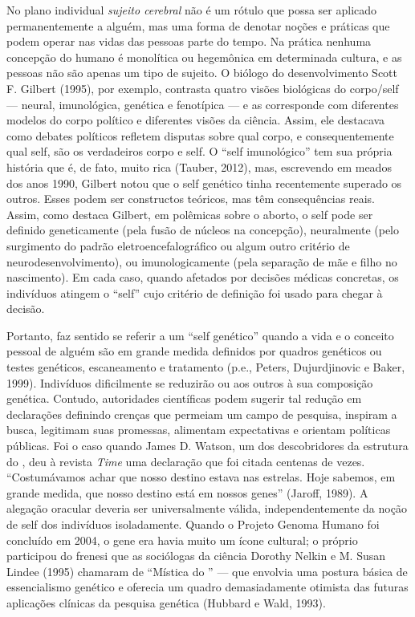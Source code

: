 No plano individual \emph{sujeito cerebral} não é um rótulo que possa
ser aplicado permanentemente a alguém, mas uma forma de denotar noções e
práticas que podem operar nas vidas das pessoas parte do tempo. Na
prática nenhuma concepção do humano é monolítica ou hegemônica em
determinada cultura, e as pessoas não são apenas um tipo de sujeito. O
biólogo do desenvolvimento Scott F. Gilbert (1995), por exemplo,
contrasta quatro visões biológicas do corpo/self --- neural,
imunológica, genética e fenotípica --- e as corresponde com diferentes
modelos do corpo político e diferentes visões da ciência. Assim, ele
destacava como debates políticos refletem disputas sobre qual corpo, e
consequentemente qual self, são os verdadeiros corpo e self. O ``self
imunológico'' tem sua própria história que é, de fato, muito rica
(Tauber, 2012), mas, escrevendo em meados dos anos 1990, Gilbert notou
que o self genético tinha recentemente superado os outros. Esses podem
ser constructos teóricos, mas têm consequências reais. Assim, como
destaca Gilbert, em polêmicas sobre o aborto, o self pode ser definido
geneticamente (pela fusão de núcleos na concepção), neuralmente (pelo
surgimento do padrão eletroencefalográfico ou algum outro critério de
neurodesenvolvimento), ou imunologicamente (pela separação de mãe e
filho no nascimento). Em cada caso, quando afetados por decisões médicas
concretas, os indivíduos atingem o ``self'' cujo critério de definição
foi usado para chegar à decisão.

Portanto, faz sentido se referir a um ``self genético'' quando a vida e
o conceito pessoal de alguém são em grande medida definidos por quadros
genéticos ou testes genéticos, escaneamento e tratamento (p.e., Peters,
Dujurdjinovic e Baker, 1999). Indivíduos dificilmente se reduzirão ou
aos outros à sua composição genética. Contudo, autoridades científicas
podem sugerir tal redução em declarações definindo crenças que permeiam
um campo de pesquisa, inspiram a busca, legitimam suas promessas,
alimentam expectativas e orientam políticas públicas. Foi o caso quando
James D. Watson, um dos descobridores da estrutura do , deu à revista
\emph{Time} uma declaração que foi citada centenas de vezes.
``Costumávamos achar que nosso destino estava nas estrelas. Hoje
sabemos, em grande medida, que nosso destino está em nossos genes''
(Jaroff, 1989). A alegação oracular deveria ser universalmente válida,
independentemente da noção de self dos indivíduos isoladamente. Quando o
Projeto Genoma Humano foi concluído em 2004, o gene era havia muito um
ícone cultural; o próprio  participou do frenesi que as sociólogas da
ciência Dorothy Nelkin e M. Susan Lindee (1995) chamaram de ``Mística do
'' --- que envolvia uma postura básica de essencialismo genético e
oferecia um quadro demasiadamente otimista das futuras aplicações
clínicas da pesquisa genética (Hubbard e Wald, 1993).

